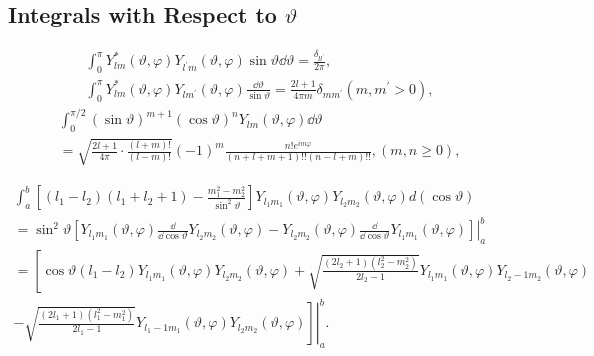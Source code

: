 \subsection{Integrals with Respect to $\vartheta$}\label{sec:5.9.3}
\begin{fleqn}
\begin{gather}
\int_{0}^{\pi} Y_{l m}^{*}(\vartheta, \varphi) Y_{l^{\prime} m}(\vartheta, \varphi) \sin \vartheta \dd \vartheta=\frac{\delta_{l l^{\prime}}}{2 \pi} ,  \label{eq:5:9:10}\\
\int_{0}^{\pi} Y_{l m}^{*}(\vartheta, \varphi) Y_{l m^{\prime}}(\vartheta, \varphi) \frac{\dd  \vartheta}{\sin \vartheta}=\frac{2 l+1}{4 \pi m} \delta_{m m^{\prime}}\left(m, m^{\prime}>0\right) ,  \label{eq:5:9:11}
\end{gather}
\begin{multline}
\int_{0}^{\pi / 2}(\sin \vartheta)^{m+1}(\cos \vartheta)^{n} Y_{l m}(\vartheta, \varphi) \dd \vartheta  \\
=\sqrt{\frac{2 l+1}{4 \pi} \cdot \frac{(l+m)!}{(l-m)!}}(-1)^{m} \frac{n!e^{i m \varphi}}{(n+l+m+1)!!(n-l+m)!!},(m, n \geq 0),  \label{eq:5:9:12}
\end{multline}
\begin{corrected}
\begin{multline}
\int_{a}^{b}\left[\left(l_{1}-l_{2}\right)\left(l_{1}+l_{2}+1\right)-\frac{m_{1}^{2}-m_{2}^{2}}{\sin ^{2} \vartheta}\right] Y_{l_{1} m_{1}}(\vartheta, \varphi) Y_{l_{2} m_{2}}(\vartheta, \varphi) d(\cos \vartheta) \\
=\left.\sin ^{2} \vartheta\left[Y_{l_{1} m_{1}}(\vartheta, \varphi) \frac{\dd }{\dd  \cos \vartheta} Y_{l_{2} m_{2}}(\vartheta, \varphi)-Y_{l_{2} m_{2}}(\vartheta, \varphi) \frac{\dd }{\dd  \cos \vartheta} Y_{l_{1} m_{1}}(\vartheta, \varphi)\right]\right|_{a} ^{b}  \\
=\left[\cos \vartheta\left(l_{1}-l_{2}\right) Y_{l_{1} m_{1}}(\vartheta, \varphi) Y_{l_{2} m_{2}}(\vartheta, \varphi)+\sqrt{\frac{\left(2 l_{2}+1\right)\left(l_{2}^{2}-m_{2}^{2}\right)}{2 l_{2}-1}} Y_{l_{1} m_{1}}(\vartheta, \varphi) Y_{l_{2}-1 m_{2}}(\vartheta, \varphi)\right. \\
\left.\left.-\sqrt{\frac{\left(2 l_{1}+1\right)\left(l_{1}^{2}-m_{1}^{2}\right)}{2 l_{1}-1}} Y_{l_{1}-1 m_{1}}(\vartheta, \varphi) Y_{l_{2} m_{2}}(\vartheta, \varphi)\right]\right|_{a} ^{b} . \label{eq:5:9:13}
\end{multline}
\end{corrected}
\end{fleqn}
